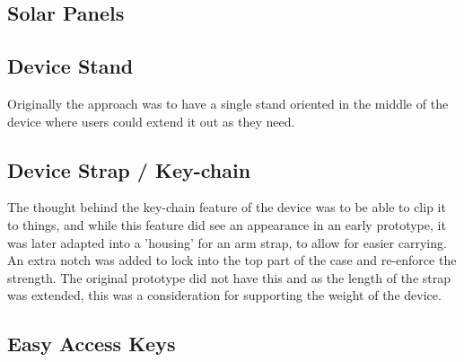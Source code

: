 \subsection{Solar Panels}


\subsection{Device Stand}

Originally the approach was to have a single stand oriented in the middle of the device where users could extend it out as they need.

\subsection{Device Strap / Key-chain}

The thought behind the key-chain feature of the device was to be able to clip it to things, and while this feature did see an appearance in an early prototype, it was later adapted into a 'housing' for an arm strap, to allow for easier carrying.
An extra notch was added to lock into the top part of the case and re-enforce the strength. The original prototype did not have this and as the length of the strap was extended, this was a consideration for supporting the weight of the device.

\subsection{Easy Access Keys}

